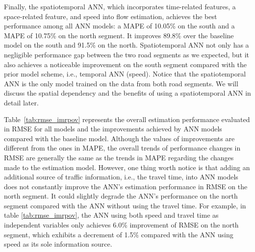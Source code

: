 \documentclass[english]{kththesis}
\begin{document}
Finally, the spatiotemporal ANN, which incorporates time-related features, a space-related feature, and speed into flow estimation, achieves the best performance among all ANN models: a MAPE of 10.05\% on the south and a MAPE of 10.75\% on the north segment. It improves 89.8\% over the baseline model on the south and 91.5\% on the north. Spatiotemporal ANN not only has a negligible performance gap between the two road segments as we expected, but it also achieves a noticeable improvement on the south segment compared with the prior model scheme, i.e., temporal ANN (speed). Notice that the spatiotemporal ANN is the only model trained on the data from both road segments. We will discuss the spatial dependency and the benefits of using a spatiotemporal ANN in detail later.

Table~\ref{tab:rmse_imrpov} represents the overall estimation performance evaluated in RMSE for all models and the improvements achieved by ANN models compared with the baseline model. Although the values of improvements are different from the ones in MAPE, the overall trends of performance changes in RMSE are generally the same as the trends in MAPE regarding the changes made to the estimation model. However, one thing worth notice is that adding an additional source of traffic information, i.e., the travel time, into ANN models does not constantly improve the ANN's estimation performance in RMSE on the north segment. It could slightly degrade the ANN's performance on the north segment compared with the ANN without using the travel time. For example, in table \ref{tab:rmse_imrpov}, the ANN using both speed and travel time as independent variables only achieves 6.0\% improvement of RMSE on the north segment, which exhibits a decrement of 1.5\% compared with the ANN using speed as its sole information source.
\end{document}
